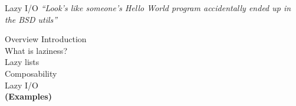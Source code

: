 \documentclass[20pt]{beamer}
\begin{document}
\begin{frame}{Lazy I/O}
    \textit{``Look's like someone's Hello World program accidentally ended up in
    the BSD utils''}
\end{frame}


\begin{frame}{Overview}
    Introduction \\
    What is laziness? \\
    Lazy lists \\
    Composability \\
    Lazy I/O \\
    \textbf{(Examples)}
\end{frame}
\end{document}
